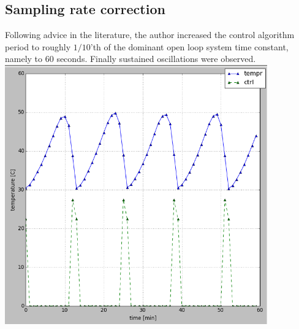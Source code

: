 \subsection{Sampling rate correction}
Following advice in the literature, the author increased the control algorithm period to roughly $1/10$'th of the dominant open loop system time constant, namely to 60 seconds.
Finally sustained oscillations were observed.
\\
\includegraphics[width=0.85\textwidth]{../images/exp_relay_slow}~


